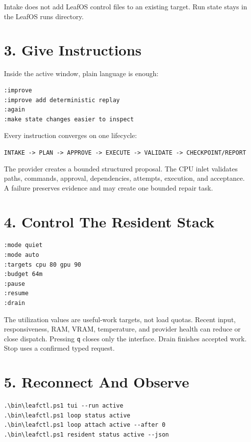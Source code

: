 \documentclass[11pt,a4paper]{article}
\begin{document}
Intake does not add LeafOS control files to an existing target. Run state stays
in the LeafOS runs directory.

\section*{3. Give Instructions}

Inside the active window, plain language is enough:

\begin{lstlisting}
:improve
:improve add deterministic replay
:again
:make state changes easier to inspect
\end{lstlisting}

Every instruction converges on one lifecycle:

\begin{center}
\texttt{INTAKE -> PLAN -> APPROVE -> EXECUTE -> VALIDATE -> CHECKPOINT/REPORT}
\end{center}

The provider creates a bounded structured proposal. The CPU inlet validates
paths, commands, approval, dependencies, attempts, execution, and acceptance.
A failure preserves evidence and may create one bounded repair task.

\section*{4. Control The Resident Stack}

\begin{lstlisting}
:mode quiet
:mode auto
:targets cpu 80 gpu 90
:budget 64m
:pause
:resume
:drain
\end{lstlisting}

The utilization values are useful-work targets, not load quotas. Recent input,
responsiveness, RAM, VRAM, temperature, and provider health can reduce or close
dispatch. Pressing \texttt{q} closes only the interface. Drain finishes
accepted work. Stop uses a confirmed typed request.

\section*{5. Reconnect And Observe}

\begin{lstlisting}
.\bin\leafctl.ps1 tui --run active
.\bin\leafctl.ps1 loop status active
.\bin\leafctl.ps1 loop attach active --after 0
.\bin\leafctl.ps1 resident status active --json
\end{lstlisting}
\end{document}

